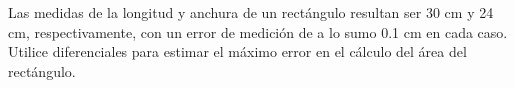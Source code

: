 \item Las medidas de la longitud y anchura de un rectángulo resultan ser 30 cm y 24 cm, respectivamente, con un error de medición de a lo sumo 0.1 cm en cada caso. Utilice diferenciales para estimar el máximo error en el cálculo del área del rectángulo.
